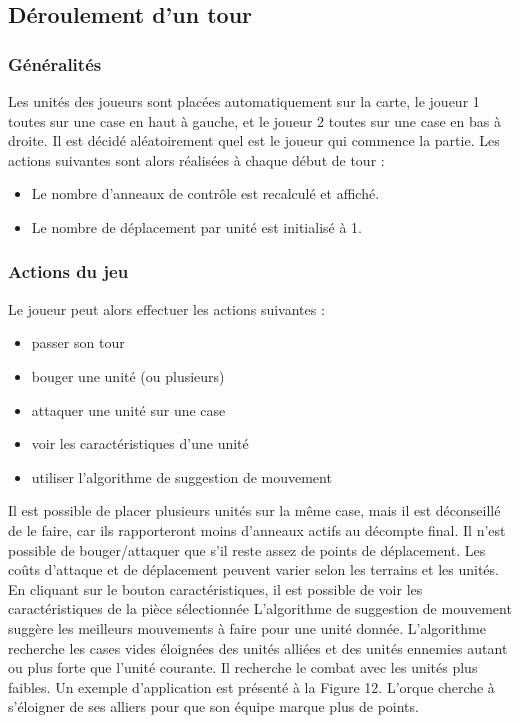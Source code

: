 \subsection{Déroulement d'un tour}
\subsubsection{Généralités}

Les unités des joueurs sont placées automatiquement sur la carte, le joueur 1 toutes sur une case en haut à gauche, et le joueur 2 toutes sur une case en bas à droite. Il est décidé aléatoirement quel est le joueur qui commence la partie.
\newline
\newline
Les actions suivantes sont alors réalisées à chaque début de tour :
\begin{itemize}
\item Le nombre d'anneaux de contrôle est recalculé et affiché.
\item Le nombre de déplacement par unité est initialisé à 1.
\end{itemize}

\subsubsection{Actions du jeu}

Le joueur peut alors effectuer les actions suivantes :
\begin{itemize}
\item passer son tour
\item bouger une unité (ou plusieurs)
\item attaquer une unité sur une case
\item voir les caractéristiques d'une unité
\item utiliser l'algorithme de suggestion de mouvement
\newline
\end{itemize}

Il est possible de placer plusieurs unités sur la même case, mais il est déconseillé de le faire, car ils rapporteront moins d'anneaux actifs au décompte final.
\newline
\newline
Il n'est possible de bouger/attaquer que s'il reste assez de points de déplacement. Les coûts d'attaque et de déplacement peuvent varier selon les terrains et les unités.
\newline
En cliquant sur le bouton caractéristiques, il est possible de voir les caractéristiques de la pièce sélectionnée
\newline
\newline
L'algorithme de suggestion de mouvement suggère les meilleurs mouvements à faire pour une unité donnée. L'algorithme recherche les cases vides éloignées des unités alliées et des unités ennemies autant ou plus forte que l'unité courante. Il recherche le combat avec les unités plus faibles.
\newline
Un exemple d'application est présenté à la Figure 12. L'orque cherche à s'éloigner de ses alliers pour que son équipe marque plus de points.
\newline
\newline

